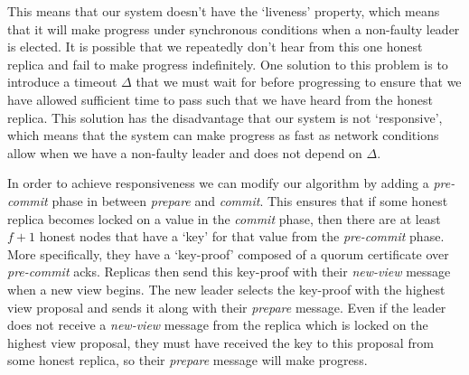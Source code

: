 This means that our system doesn't have the `liveness' property, which means that it will make progress under synchronous conditions when a non-faulty leader is elected. It is possible that we repeatedly don't hear from this one honest replica and fail to make progress indefinitely. One solution to this problem is to introduce a timeout $\Delta$ that we must wait for before progressing to ensure that we have allowed sufficient time to pass such that we have heard from the honest replica. This solution has the disadvantage that our system is not `responsive', which means that the system can make progress as fast as network conditions allow when we have a non-faulty leader and does not depend on $\Delta$.

In order to achieve responsiveness we can modify our algorithm by adding a \textit{pre-commit} phase in between \textit{prepare} and \textit{commit}. This ensures that if some honest replica becomes locked on a value in the \textit{commit} phase, then there are at least $f + 1$ honest nodes that have a `key' for that value from the \textit{pre-commit} phase. More specifically, they have a `key-proof' composed of a quorum certificate over \textit{pre-commit} acks. Replicas then send this key-proof with their \textit{new-view} message when a new view begins. The new leader selects the key-proof with the highest view proposal and sends it along with their \textit{prepare} message. Even if the leader does not receive a \textit{new-view} message from the replica which is locked on the highest view proposal, they must have received the key to this proposal from some honest replica, so their \textit{prepare} message will make progress.

